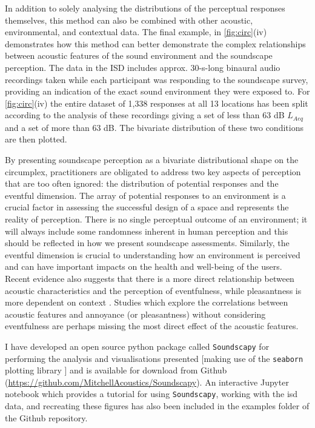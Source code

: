In addition to solely analysing the distributions of the perceptual responses themselves, this method can also be combined with other acoustic, environmental, and contextual data. The final example, in \cref{fig:circ}(iv) demonstrates how this method can better demonstrate the complex relationships between acoustic features of the sound environment and the soundscape perception. The data in the ISD includes approx. 30-s-long binaural audio recordings taken while each participant was responding to the soundscape survey, providing an indication of the exact sound environment they were exposed to. For \cref{fig:circ}(iv) the entire dataset of 1,338 responses at all 13 locations has been split according to the analysis of these recordings giving a set of less than 63 dB $L_{Aeq}$ and a set of more than 63 dB. The bivariate distribution of these two conditions are then plotted.

By presenting soundscape perception as a bivariate distributional shape on the circumplex, practitioners are obligated to address two key aspects of perception that are too often ignored: the distribution of potential responses and the eventful dimension. The array of potential responses to an environment is a crucial factor in assessing the successful design of a space and represents the reality of perception. There is no single perceptual outcome of an environment; it will always include some randomness inherent in human perception and this should be reflected in how we present soundscape assessments. Similarly, the eventful dimension is crucial to understanding how an environment is perceived and can have important impacts on the health and well-being of the users. Recent evidence also suggests that there is a more direct relationship between acoustic characteristics and the perception of eventfulness, while pleasantness is more dependent on context \citep{Mitchell2021Investigating}. Studies which explore the correlations between acoustic features and annoyance (or pleasantness) without considering eventfulness are perhaps missing the most direct effect of the acoustic features.

I have developed an open source python package called \texttt{Soundscapy} for performing the analysis and visualisations presented [making use of the \texttt{seaborn} plotting library \citep{Waskom2021seaborn}] and is available for download from Github (\url{https://github.com/MitchellAcoustics/Soundscapy}). An interactive Jupyter notebook which provides a tutorial for using \texttt{Soundscapy}, working with the \gls{isd} data, and recreating these figures has also been included in the examples folder of the Github repository.

